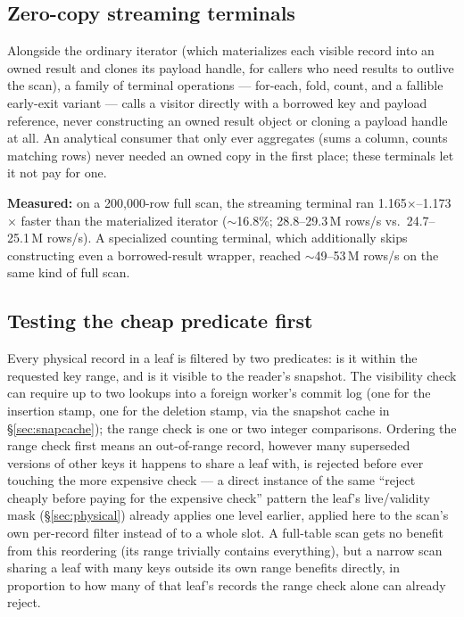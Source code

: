 \documentclass[11pt]{article}
\begin{document}
\subsection{Zero-copy streaming terminals}

Alongside the ordinary iterator (which materializes each visible record into an
owned result and clones its payload handle, for callers who need results to outlive
the scan), a family of terminal operations --- for-each, fold, count, and a
fallible early-exit variant --- calls a visitor directly with a borrowed key and
payload reference, never constructing an owned result object or cloning a payload
handle at all. An analytical consumer that only ever aggregates (sums a column,
counts matching rows) never needed an owned copy in the first place; these
terminals let it not pay for one.

\textbf{Measured:} on a 200,000-row full scan, the streaming terminal ran
1.165$\times$--1.173$\times$ faster than the materialized iterator ($\sim$16.8\%;
28.8--29.3\,M rows/s vs.\ 24.7--25.1\,M rows/s). A specialized counting terminal,
which additionally skips constructing even a borrowed-result wrapper, reached
$\sim$49--53\,M rows/s on the same kind of full scan.

\subsection{Testing the cheap predicate first}

Every physical record in a leaf is filtered by two predicates: is it within the
requested key range, and is it visible to the reader's snapshot. The visibility
check can require up to two lookups into a foreign worker's commit log (one for the
insertion stamp, one for the deletion stamp, via the snapshot cache in
\S\ref{sec:snapcache}); the range check is one or two integer comparisons. Ordering
the range check first means an out-of-range record, however many superseded
versions of other keys it happens to share a leaf with, is rejected before ever
touching the more expensive check --- a direct instance of the same ``reject
cheaply before paying for the expensive check'' pattern the leaf's live/validity
mask (\S\ref{sec:physical}) already applies one level earlier, applied here to the
scan's own per-record filter instead of to a whole slot. A full-table scan gets no
benefit from this reordering (its range trivially contains everything), but a
narrow scan sharing a leaf with many keys outside its own range benefits directly,
in proportion to how many of that leaf's records the range check alone can already
reject.
\end{document}
